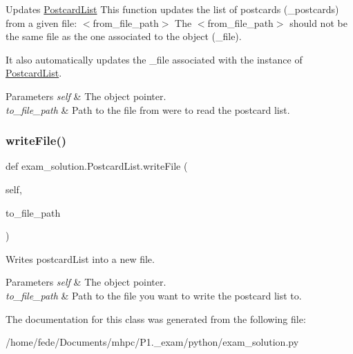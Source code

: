Updates \mbox{\hyperlink{classexam__solution_1_1PostcardList}{Postcard\+List}} This function updates the list of postcards (\+\_\+postcards) from a given file\+: $<$from\+\_\+file\+\_\+path$>$ The $<$from\+\_\+file\+\_\+path$>$ should not be the same file as the one associated to the object (\+\_\+file). 

It also automatically updates the \+\_\+file associated with the instance of \mbox{\hyperlink{classexam__solution_1_1PostcardList}{Postcard\+List}}. 
\begin{DoxyParams}{Parameters}
{\em self} & The object pointer. \\
\hline
{\em to\+\_\+file\+\_\+path} & Path to the file from were to read the postcard list. \\
\hline
\end{DoxyParams}
\mbox{\label{classexam__solution_1_1PostcardList_a42a5668fee4754dde1e3fd0b3d8a992e}} 
\subsubsection{\texorpdfstring{writeFile()}{writeFile()}}
{\footnotesize\ttfamily def exam\+\_\+solution.\+Postcard\+List.\+write\+File (\begin{DoxyParamCaption}\item[{}]{self,  }\item[{}]{to\+\_\+file\+\_\+path }\end{DoxyParamCaption})}



Writes postcard\+List into a new file. 


\begin{DoxyParams}{Parameters}
{\em self} & The object pointer. \\
\hline
{\em to\+\_\+file\+\_\+path} & Path to the file you want to write the postcard list to. \\
\hline
\end{DoxyParams}


The documentation for this class was generated from the following file\+:\begin{DoxyCompactItemize}
\item 
/home/fede/\+Documents/mhpc/\+P1.\+\_\+exam/python/exam\+\_\+solution.\+py\end{DoxyCompactItemize}

